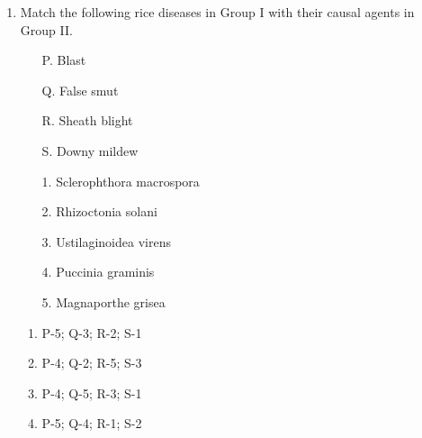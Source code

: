 \documentclass[journal,12pt,onecolumn]{IEEEtran}
\begin{document}
\begin{enumerate}
    \item \begin{minipage}{0.45\textwidth}
    Match the following rice diseases in Group I with their causal agents in Group II.
    \begin{itemize}
        \item[P.] Blast
        \item[Q.] False smut
        \item[R.] Sheath blight
        \item[S.] Downy mildew
    \end{itemize}
    \end{minipage}
    \begin{minipage}{0.45\textwidth}
    \begin{itemize}
        \item[1.] Sclerophthora macrospora
        \item[2.] Rhizoctonia solani
        \item[3.] Ustilaginoidea virens
        \item[4.] Puccinia graminis
        \item[5.] Magnaporthe grisea
    \end{itemize}
    \end{minipage}
    \begin{enumerate}
        \item P-5; Q-3; R-2; S-1
        \item P-4; Q-2; R-5; S-3
        \item P-4; Q-5; R-3; S-1
        \item P-5; Q-4; R-1; S-2
    \end{enumerate}


\end{enumerate}
\end{document}
